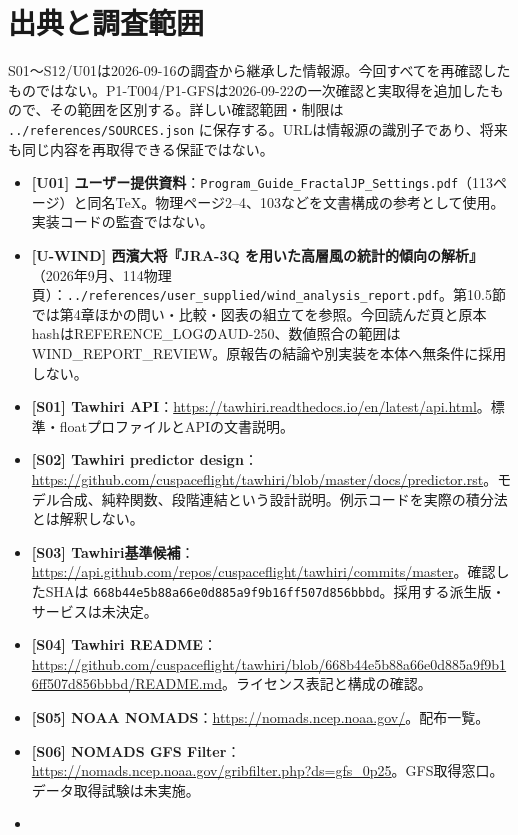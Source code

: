 \documentclass[11pt,a4paper]{article}
\providecommand{\tightlist}{\setlength{\itemsep}{1pt}\setlength{\parskip}{1pt}}
\begin{document}
\section{出典と調査範囲}\label{ux51faux5178ux3068ux8abfux67fbux7bc4ux56f2}

S01〜S12/U01は2026-09-16の調査から継承した情報源。今回すべてを再確認したものではない。P1-T004/P1-GFSは2026-09-22の一次確認と実取得を追加したもので、その範囲を区別する。詳しい確認範囲・制限は
\texttt{../references/SOURCES.json}
に保存する。URLは情報源の識別子であり、将来も同じ内容を再取得できる保証ではない。

\begin{itemize}
\tightlist
\item
  \textbf{{[}U01{]}
  ユーザー提供資料}：\texttt{Program\_Guide\_FractalJP\_Settings.pdf}（113ページ）と同名TeX。物理ページ2--4、103などを文書構成の参考として使用。実装コードの監査ではない。
\item
  \textbf{{[}U-WIND{]} 西濱大将『JRA-3Q
  を用いた高層風の統計的傾向の解析』}（2026年9月、114物理頁）：\texttt{../references/user\_supplied/wind\_analysis\_report.pdf}。第10.5節では第4章ほかの問い・比較・図表の組立てを参照。今回読んだ頁と原本hashはREFERENCE\_LOGのAUD-250、数値照合の範囲はWIND\_REPORT\_REVIEW。原報告の結論や別実装を本体へ無条件に採用しない。
\item
  \textbf{{[}S01{]} Tawhiri
  API}：\url{https://tawhiri.readthedocs.io/en/latest/api.html}。標準・floatプロファイルとAPIの文書説明。
\item
  \textbf{{[}S02{]} Tawhiri predictor
  design}：\url{https://github.com/cuspaceflight/tawhiri/blob/master/docs/predictor.rst}。モデル合成、純粋関数、段階連結という設計説明。例示コードを実際の積分法とは解釈しない。
\item
  \textbf{{[}S03{]}
  Tawhiri基準候補}：\url{https://api.github.com/repos/cuspaceflight/tawhiri/commits/master}。確認したSHAは
  \texttt{668b44e5b88a66e0d885a9f9b16ff507d856bbbd}。採用する派生版・サービスは未決定。
\item
  \textbf{{[}S04{]} Tawhiri
  README}：\url{https://github.com/cuspaceflight/tawhiri/blob/668b44e5b88a66e0d885a9f9b16ff507d856bbbd/README.md}。ライセンス表記と構成の確認。
\item
  \textbf{{[}S05{]} NOAA
  NOMADS}：\url{https://nomads.ncep.noaa.gov/}。配布一覧。
\item
  \textbf{{[}S06{]} NOMADS GFS
  Filter}：\url{https://nomads.ncep.noaa.gov/gribfilter.php?ds=gfs_0p25}。GFS取得窓口。データ取得試験は未実施。
\item

\end{itemize}
\end{document}
